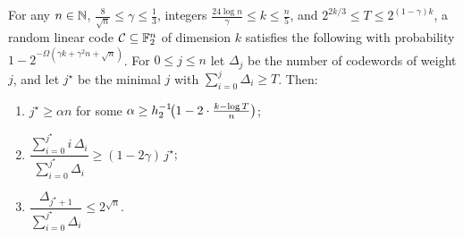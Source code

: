 \begin{lemma}
  \label{lem:weight-dist}
  For any $n \in \mathbb{N}$, $\frac{8}{\sqrt n}\leq \gamma\leq \frac13$, integers
  $\frac{24\log n}{\gamma}\leq k\leq \frac{n}{5}$, and
  $2^{2k/3}\leq T\leq 2^{(1-\gamma)k}$, a random linear code
  $\mathcal{C} \subseteq \mathbb{F}_2^n$ of dimension $k$ satisfies the following with
  probability $1 - 2^{-\Omega(\gamma k + \gamma^2 n + \sqrt n)}$. For
  $0 \leq j \leq n$ let $\Delta_j$ be the number of codewords of weight $j$, and
  let $j^\star$ be the minimal $j$ with $\sum_{i=0}^j \Delta_i \geq T$. Then:
  \begin{enumerate}
    \item $j^\star \geq \alpha n$ for some $\alpha \geq h_2^{-1}\!\big(1 - 2\cdot
      \frac{k-\log T}{n}\big)$;
    \item $\dfrac{\sum_{i=0}^{j^\star} i\,\Delta_i}{\sum_{i=0}^{j^\star}\Delta_i}
      \geq (1 - 2\gamma)\,j^\star$;
    \item $\dfrac{\Delta_{j^\star+1}}{\sum_{i=0}^{j^\star}\Delta_i}\leq 2^{\sqrt n}$.
  \end{enumerate}
\end{lemma}
